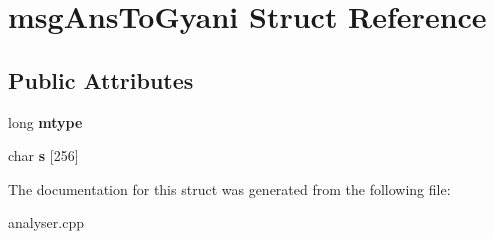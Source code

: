 \hypertarget{structmsgAnsToGyani}{\section{msg\-Ans\-To\-Gyani \-Struct \-Reference}
\label{structmsgAnsToGyani}
}
\subsection*{\-Public \-Attributes}
\begin{DoxyCompactItemize}
\item 
\hypertarget{structmsgAnsToGyani_a4cf2b67d4fe5f67d481cc3da9b33531d}{long {\bfseries mtype}}\label{structmsgAnsToGyani_a4cf2b67d4fe5f67d481cc3da9b33531d}

\item 
\hypertarget{structmsgAnsToGyani_a3c4525f6f5c3407acadb08c56ef21cc6}{char {\bfseries s} \mbox{[}256\mbox{]}}\label{structmsgAnsToGyani_a3c4525f6f5c3407acadb08c56ef21cc6}

\end{DoxyCompactItemize}


\-The documentation for this struct was generated from the following file\-:\begin{DoxyCompactItemize}
\item 
analyser.\-cpp\end{DoxyCompactItemize}

